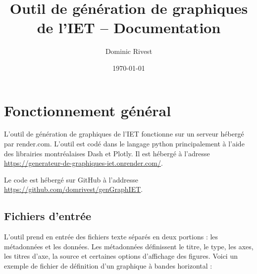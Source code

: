 \documentclass[11pt]{article}
\title{Outil de génération de graphiques de l'IET -- Documentation}
\author{ Dominic Rivest }
\date{\today}
\begin{document}
\maketitle	

\tableofcontents
\pagebreak


\section{Fonctionnement général}

L'outil de génération de graphiques de l'IET fonctionne sur un serveur hébergé par render.com. L'outil est codé dans le langage python principalement à l'aide des librairies montréalaises Dash et Plotly. Il est hébergé à l'adresse \href{https://generateur-de-graphiques-iet.onrender.com/}{https://generateur-de-graphiques-iet.onrender.com/}.

Le code est hébergé sur GitHub à l'addresse \href{https://github.com/domrivest/genGraphIET}{https://github.com/domrivest/genGraphIET}.

\subsection{Fichiers d'entrée}
L'outil prend en entrée des fichiers texte séparés en deux portions : les métadonnées et les données. Les métadonnées définissent le titre, le type, les axes, les titres d'axe, la source et certaines options d'affichage des figures. Voici un exemple de fichier de définition d'un graphique à bandes horizontal : 
\end{document}
